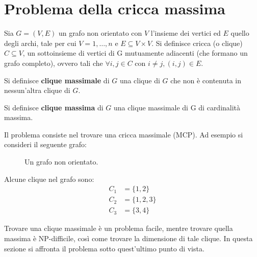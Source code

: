 \newpage

\section{Problema della cricca massima} %
\label{sec:problema_della_cricca_massima}

Sia $G=(V,E)$ un grafo non orientato con $V$ l'insieme dei vertici ed $E$ quello degli archi, tale per cui $V={1,\dots,n}$ e $E \subseteq V \times V$. Si definisce cricca (o clique) $C \subseteq V$, un sottoinsieme di vertici di G mutuamente adiacenti (che formano un grafo completo), ovvero tali che $\forall i,j \in C$ con $i \neq j, (i,j) \in E$.

\begin{mydef}
Si definisce \textbf{clique massimale} di $G$ una clique di $G$ che non è contenuta in nessun'altra clique di $G$.    
\end{mydef}

\begin{mydef}
    Si definisce \textbf{clique massima} di $G$ una clique massimale di G di cardinalità massima.
\end{mydef}
Il problema consiste nel trovare una cricca massimale (MCP). Ad esempio si consideri il seguente grafo:

\begin{figure}[h!]
    \centering
    \caption{Un grafo non orientato.}\label{fig:graph1}
\end{figure}
Alcune clique nel grafo sono:
\begin{align*}
    C_1 &= \{1,2\} \tag{$C_1$ non è massimale perché $C_1 \subseteq C_2$}\\
    C_2 &= \{1,2,3\} \tag{Massimale e massima}\\
    C_3 &= \{3,4\} \tag{Massimale}
\end{align*}

\newpage

Trovare una clique massimale è un problema facile, mentre trovare quella massima è NP-difficile, così come trovare la dimensione di tale clique. In questa sezione si affronta il problema sotto quest'ultimo punto di vista.

